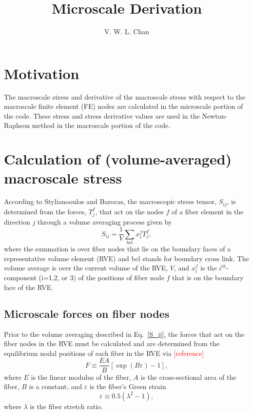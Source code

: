 \documentclass[12pt,aps,pre]{revtex4}
\newcommand{\red}[1]{\textcolor{red}{[#1]}}
\begin{document}
\title{Microscale Derivation}
\author{V. W. L. Chan}
\maketitle

\section{Motivation}

The macroscale stress and derivative of the macroscale stress with respect to the macroscale finite element (FE) nodes are calculated in the microscale portion of the code. These stress and stress derivative values are used in the Newton-Raphson method in the macroscale portion of the code.

\section{Calculation of (volume-averaged) macroscale stress}
\label{sec:macrostress}

According to Stylianooulos and Barocas, the macroscopic stress tensor, $S_{ij}$, is determined from the forces, $T_j^f$, that act on the nodes $f$ of a fiber element in the direction $j$ through a volume averaging process given by
%
\begin{equation}
S_{ij} = \frac{1}{V} \sum_{\text{bcl}} x_i^f T_j^f,
\label{S_ij}
\end{equation}
%
where the summation is over fiber nodes that lie on the boundary faces of a representative volume element (RVE) and bcl stands for boundary cross link. The volume average is over the current volume of the RVE, $V$, and $x_i^f$ is the $i^{th}$-component (i=1,2, or 3) of the positions of fiber node $f$ that is on the boundary face of the RVE.

\subsection{Microscale forces on fiber nodes}

Prior to the volume averaging described in Eq.\ \eqref{S_ij}, the forces that act on the fiber nodes in the RVE must be calculated and are determined from the equilibrium nodal positions of each fiber in the RVE via \red{reference}
%
\begin{equation}
F \equiv \frac{E A}{B}[\exp(B \varepsilon) - 1],
\label{fiber_force}
\end{equation}
%
where $E$ is the linear modulus of the fiber, $A$ is the cross-sectional area of the fiber, $B$ is a constant, and $\varepsilon$ is the fiber's Green strain
%
\begin{equation}
\varepsilon \equiv 0.5 \left(\lambda^2-1\right),
\label{Green_strain}
\end{equation}
% 
where $\lambda$ is the fiber stretch ratio.
\end{document}
